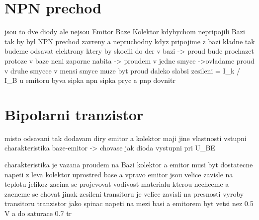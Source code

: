 \documentclass{article}
\begin{document}
\sloppy
\section{NPN prechod}
jsou to dve diody ale nejsou \smile
Emitor Baze Kolektor
kdybychom nepripojili Bazi tak by byl NPN prechod zavreny a nepruchodny
kdyz pripojime z bazi kladne tak budeme odsavat elektrony ktery by skocili do der
v bazi -> proud bude prochazet protoze v baze neni zaporne nabita  -> proudem v jedne smyce
->ovladame proud v druhe smycce v mensi smyce muze byt proud daleko slabsi
zesileni \beta = I_k / I_B
u emitoru byva sipka
npn sipka pryc a pnp dovnitr
\section{Bipolarni tranzistor}
misto odsavani tak dodavam diry
emitor a kolektor maji jine vlastnosti
vstupni charakteristika baze-emitor
  -> chovase jak dioda
vystupni pri U_{BE}

charakteristika je vazana proudem na Bazi
kolektor a emitor musi byt dostatecne napeti
z leva kolektor uprostred base a vpravo emitor
jsou velice zavisle na teplotu jelikoz zacina se projevovat vodivost materialu
kterou nechceme a zacneme se chovat jinak
zesileni transitoru je velice zavisli na presnosti vyroby transitoru
tranzistor jako spinac
napeti na mezi basi a emitorem byt vetsi nez 0.5 V a do saturace 0.7
tr
\end{document}
